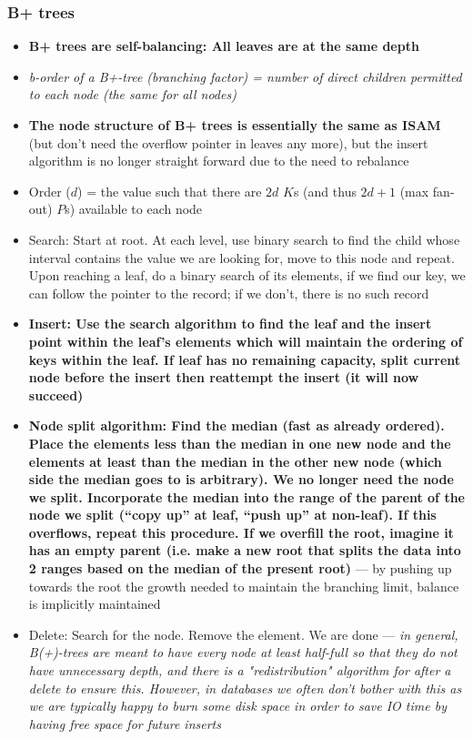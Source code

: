 \documentclass[20pt,a4paper,landscape]{extarticle}
\begin{document}
\begin{flushleft}
\subsubsection{B+ trees}
\begin{itemize}
\item \textbf{B+ trees are self-balancing: All leaves are at the same depth}
\item \textit{b-order of a B+-tree (branching factor) = number of direct children permitted to each node (the same for all nodes)}
\item \textbf{The node structure of B+ trees is essentially the same as ISAM} (but don't need the overflow pointer in leaves any more), but the insert algorithm is no longer straight forward due to the need to rebalance
\item Order ($d$) = the value such that there are $2d$ $K$s (and thus $2d+1$ (max fan-out) $P$s) available to each node
\item Search: Start at root. At each level, use binary search to find the child whose interval contains the value we are looking for, move to this node and repeat. Upon reaching a leaf, do a binary search of its elements, if we find our key, we can follow the pointer to the record; if we don’t, there is no such record
\item \textbf{Insert: Use the search algorithm to find the leaf and the insert point within the leaf's elements which will maintain the ordering of keys within the leaf. If leaf has no remaining capacity, split current node before the insert then reattempt the insert (it will now succeed)}
\item \textbf{Node split algorithm: Find the median (fast as already ordered). Place the elements less than the median in one new node and the elements at least than the median in the other new node (which side the median goes to is arbitrary). We no longer need the node we split. Incorporate the median into the range of the parent of the node we split (“copy up” at leaf, “push up” at non-leaf). If this overflows, repeat this procedure. If we overfill the root, imagine it has an empty parent (i.e. make a new root that splits the data into 2 ranges based on the median of the present root)} --- by pushing up towards the root the growth needed to maintain the branching limit, balance is implicitly maintained
\item Delete: Search for the node. Remove the element. We are done --- \textit{in general, B(+)-trees are meant to have every node at least half-full so that they do not have unnecessary depth, and there is a "redistribution" algorithm for after a delete to ensure this. However, in databases we often don’t bother with this as we are typically happy to burn some disk space in order to save IO time by having free space for future inserts}
\end{itemize}

\end{flushleft}
\end{document}
